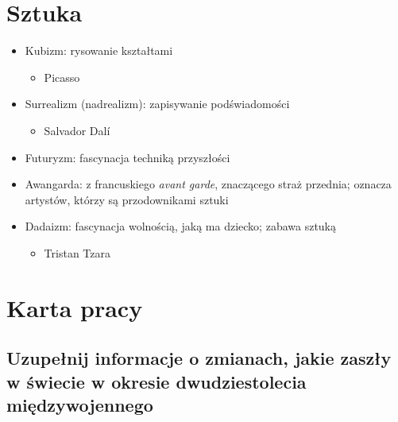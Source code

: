 \documentclass[a4paper]{article}
\begin{document}
\section*{Sztuka}
\begin{itemize}
    \item Kubizm: rysowanie kształtami \begin{itemize}
        \item Picasso
    \end{itemize}
    \item Surrealizm (nadrealizm): zapisywanie podświadomości \begin{itemize}
        \item Salvador Dal\'i
    \end{itemize}
    \item Futuryzm: fascynacja techniką przyszłości
    \item Awangarda: z francuskiego \emph{avant garde}, znaczącego straż przednia;
    oznacza artystów, którzy są przodownikami sztuki
    \item Dadaizm: fascynacja wolnością, jaką ma dziecko; zabawa sztuką\begin{itemize}
        \item Tristan Tzara
    \end{itemize}
\end{itemize}
\pagebreak
\section*{Karta pracy}
\subsection{Uzupełnij informacje o zmianach, jakie zaszły w świe\-cie w okresie dwudziestolecia międzywojennego}
\begin{table}[H]
    \centering
\end{table}
\end{document}
